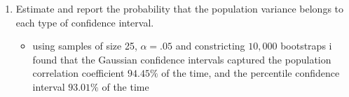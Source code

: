 \documentclass[12pt,twoside]{article}
\begin{document}
\begin{enumerate}
\begin{enumerate}
\item Estimate and report the probability that the population variance belongs to each type of confidence interval.

\begin{itemize}
    \color{blue}
    \item using samples of size 25, $\alpha=.05$ and constricting $10,000$ bootstraps i found that the Gaussian confidence intervals captured the population correlation coefficient $94.45\%$ of the time, and the percentile confidence interval $93.01\%$ of the time
\end{itemize}

\end{enumerate}

\end{enumerate}
\end{document}
